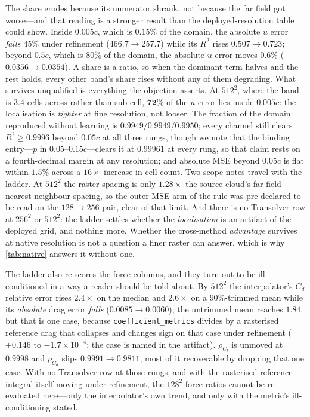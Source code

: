 The share erodes because its numerator shrank, not because the far field got worse---and
that reading is a stronger result than the deployed-resolution table could show. Inside
$0.005c$, which is $0.15\%$ of the domain, the absolute $u$ error \emph{falls $45\%$} under
refinement ($466.7\to257.7$) while its $R^2$ rises $0.507\to0.723$; beyond $0.5c$, which is
$80\%$ of the domain, the absolute $u$ error moves $0.6\%$ ($0.0356\to0.0354$). A share is a
ratio, so when the dominant term halves and the rest holds, every other band's share rises
without any of them degrading. What survives unqualified is everything the objection
asserts. At $512^2$, where the band is $3.4$ cells across rather than sub-cell,
$\mathbf{72\%}$ of the $u$ error lies inside $0.005c$: the localisation is \emph{tighter}
at fine resolution, not looser. The fraction of the domain reproduced without learning is
$0.9949/0.9949/0.9950$; every channel still clears $R^2\ge0.9996$ beyond $0.05c$ at all
three rungs, though we note that the binding entry---$p$ in $0.05$--$0.15c$---clears it at
$0.99961$ at every rung, so that claim rests on a fourth-decimal margin at any resolution;
and absolute MSE beyond $0.05c$ is flat within $1.5\%$ across a $16\times$ increase in cell
count. Two scope notes travel with the ladder. At $512^2$ the raster spacing is only
$1.28\times$ the source cloud's far-field nearest-neighbour spacing, so the outer-MSE arm of
the rule was pre-declared to be read on the $128\!\to\!256$ pair, clear of that limit. And
there is no Transolver row at $256^2$ or $512^2$: the ladder settles whether the
\emph{localisation} is an artifact of the deployed grid, and nothing more. Whether the
cross-method \emph{advantage} survives at native resolution is not a question a finer
raster can answer, which is why \autoref{tab:native} answers it without one.

The ladder also re-scores the force columns, and they turn out to be ill-conditioned in a
way a reader should be told about. By $512^2$ the interpolator's $C_d$ relative error rises
$2.4\times$ on the median and $2.6\times$ on a $90\%$-trimmed mean while its \emph{absolute}
drag error \emph{falls} ($0.0085\to0.0060$); the untrimmed mean reaches $1.84$, but that is
one case, because \texttt{coefficient\_metrics} divides by a rasterised reference drag that
collapses and changes sign on that case under refinement ($+0.146$ to
$-1.7\times10^{-4}$; the case is named in the artifact). $\rho_{C_l}$ is unmoved at
$0.9998$ and $\rho_{C_d}$ slips $0.9991\to0.9811$, most of it recoverable by dropping that
one case. With no Transolver row at those rungs, and with the rasterised reference integral
itself moving under refinement, the $128^2$ force ratios cannot be re-evaluated here---only
the interpolator's own trend, and only with the metric's ill-conditioning stated.

